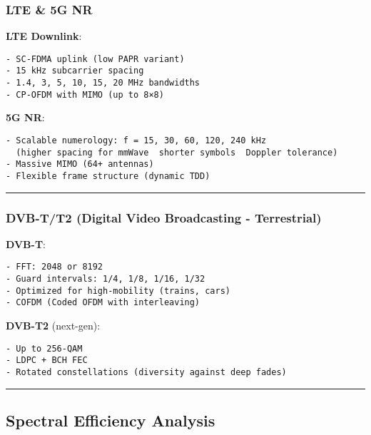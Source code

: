 \subsubsection{LTE \& 5G NR}\label{lte-5g-nr}

\textbf{LTE Downlink}:

\begin{verbatim}
- SC-FDMA uplink (low PAPR variant)
- 15 kHz subcarrier spacing
- 1.4, 3, 5, 10, 15, 20 MHz bandwidths
- CP-OFDM with MIMO (up to 8×8)
\end{verbatim}

\textbf{5G NR}:

\begin{verbatim}
- Scalable numerology: f = 15, 30, 60, 120, 240 kHz
  (higher spacing for mmWave  shorter symbols  Doppler tolerance)
- Massive MIMO (64+ antennas)
- Flexible frame structure (dynamic TDD)
\end{verbatim}

\begin{center}\rule{0.5\linewidth}{0.5pt}\end{center}

\subsubsection{DVB-T/T2 (Digital Video Broadcasting -
Terrestrial)}\label{dvb-tt2-digital-video-broadcasting---terrestrial}

\textbf{DVB-T}:

\begin{verbatim}
- FFT: 2048 or 8192
- Guard intervals: 1/4, 1/8, 1/16, 1/32
- Optimized for high-mobility (trains, cars)
- COFDM (Coded OFDM with interleaving)
\end{verbatim}

\textbf{DVB-T2} (next-gen):

\begin{verbatim}
- Up to 256-QAM
- LDPC + BCH FEC
- Rotated constellations (diversity against deep fades)
\end{verbatim}

\begin{center}\rule{0.5\linewidth}{0.5pt}\end{center}

\subsection{\texorpdfstring{ Spectral Efficiency
Analysis}{ Spectral Efficiency Analysis}}\label{spectral-efficiency-analysis}

